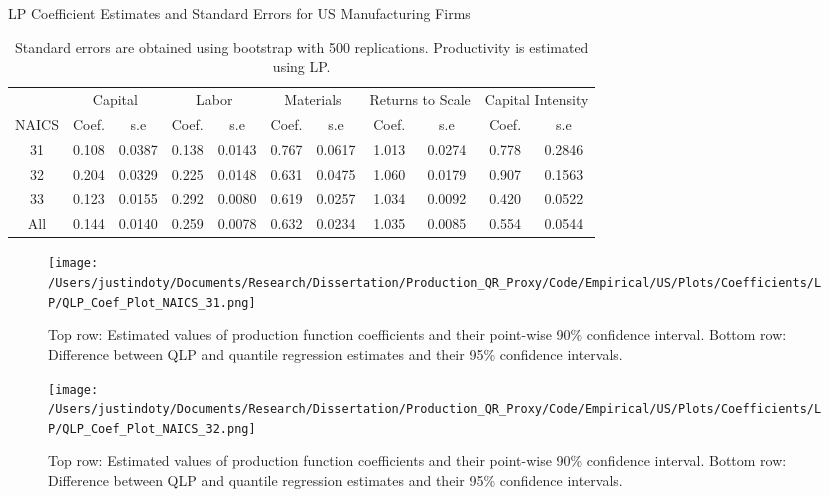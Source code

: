 \documentclass[11pt]{article}
\begin{document}
\begin{table}[H]
\centering
\caption{LP Coefficient Estimates and Standard Errors for US Manufacturing Firms}
\begin{tabular}{ccccccccccc}
  \hline\hline & \multicolumn{2}{c}{Capital} & \multicolumn{2}{c}{Labor} & \multicolumn{2}{c}{Materials} & \multicolumn{2}{c}{Returns to Scale} & \multicolumn{2}{c}{Capital Intensity}\\ \cmidrule(lr){2-3} \cmidrule(lr){4-5} \cmidrule(lr){6-7} \cmidrule(lr){8-9} \cmidrule(lr){10-11}NAICS & Coef. & s.e & Coef. & s.e & Coef. & s.e & Coef. & s.e & Coef. & s.e \\ 
  \hline
31 & 0.108 & 0.0387 & 0.138 & 0.0143 & 0.767 & 0.0617 & 1.013 & 0.0274 & 0.778 & 0.2846 \\ 
  32 & 0.204 & 0.0329 & 0.225 & 0.0148 & 0.631 & 0.0475 & 1.060 & 0.0179 & 0.907 & 0.1563 \\ 
  33 & 0.123 & 0.0155 & 0.292 & 0.0080 & 0.619 & 0.0257 & 1.034 & 0.0092 & 0.420 & 0.0522 \\ 
  All & 0.144 & 0.0140 & 0.259 & 0.0078 & 0.632 & 0.0234 & 1.035 & 0.0085 & 0.554 & 0.0544 \\ 
   \hline
\end{tabular}
\caption*{\footnotesize Standard errors are obtained using bootstrap with 500 replications. Productivity is estimated using LP.}
\end{table}

\begin{figure}[H]
\centering
\texttt{[image: /Users/justindoty/Documents/Research/Dissertation/Production\_QR\_Proxy/Code/Empirical/US/Plots/Coefficients/LP/QLP\_Coef\_Plot\_NAICS\_31.png]}
\caption{Top row: Estimated values of production function coefficients and their point-wise 90\% confidence interval. Bottom row: Difference between QLP and quantile regression estimates and their 95\% confidence intervals.}
\label{fig:31coef}
\end{figure}

\begin{figure}[H]
\centering
\texttt{[image: /Users/justindoty/Documents/Research/Dissertation/Production\_QR\_Proxy/Code/Empirical/US/Plots/Coefficients/LP/QLP\_Coef\_Plot\_NAICS\_32.png]}
\caption{Top row: Estimated values of production function coefficients and their point-wise 90\% confidence interval. Bottom row: Difference between QLP and quantile regression estimates and their 95\% confidence intervals.}
\label{fig:32coef}
\end{figure}
\end{document}

